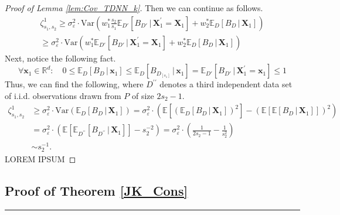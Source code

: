 \documentclass[letterpaper,10pt]{article}
\numberwithin{equation}{section}
\numberwithin{thm}{section}
\numberwithin{lem}{section}
\numberwithin{cor}{section}
\newcommand{\E}{\mathbb{E}}
\newcommand{\1}{\mathbbm{1}}
\newcommand{\Var}{\text{Var}}
\begin{document}
\begin{proof}[Proof of Lemma \ref{lem:Cov_TDNN_k}]
	Then we can continue as follows.
	\begin{equation}
		\begin{aligned}
			\zeta_{s_1, s_2}^{1}
			\geq \sigma_{\varepsilon}^{2}\cdot \Var\left(w_{1}^{*}\frac{s_2}{s_1}\E_{D'}\left[B_{D'}\, \Big| \, \mathbf{X}_1^{\prime} = \mathbf{X}_1 \right]
			+ w_{2}^{*}\E_D\left[B_D\, \Big| \, \mathbf{X}_1\right]\right)\\
			\geq \sigma_{\varepsilon}^{2}\cdot \Var\left(w_{1}^{*}\E_{D'}\left[B_{D'}\, \Big| \, \mathbf{X}_1^{\prime} = \mathbf{X}_1 \right]
			+ w_{2}^{*}\E_D\left[B_D\, \Big| \, \mathbf{X}_1\right]\right)
		\end{aligned}
	\end{equation}
	Next, notice the following fact.
	\begin{equation}
		\forall \mathbf{x}_1 \in \mathbb{R}^d: \quad 
		0
		\leq \E_D\left[B_D\, \Big| \, \mathbf{x}_1\right] 
		\leq \E_D\left[B_{D_{[s_1]}}\, \Big| \, \mathbf{x}_1\right] 
		= \E_{D'}\left[B_{D'}\, \Big| \, \mathbf{X}_1^{\prime} = \mathbf{x}_1\right] 
		\leq 1
	\end{equation}
	Thus, we can find the following, where $D^{\prime \prime}$ denotes a third independent data set of i.i.d. observations drawn from $P$ of size $2s_2 - 1$.
	\begin{equation}
		\begin{aligned}
			\zeta_{s_1, s_2}^{1}
			& \geq \sigma_{\varepsilon}^{2}\cdot \Var\left(\E_D\left[B_D\, \Big| \, \mathbf{X}_1\right]\right)
			= \sigma_{\varepsilon}^{2}\cdot \left(
				\E\left[\left(\E_D\left[B_D\, \Big| \, \mathbf{X}_1\right]\right)^2\right]
				- \left(\E\left[\E\left[B_D\, \Big| \, \mathbf{X}_1\right]\right]\right)^2
			\right)\\
			& = \sigma_{\varepsilon}^{2}\cdot \left(
				\E\left[\E_{D^{\prime \prime}}\left[B_{D^{\prime \prime}}\, \Big| \, \mathbf{X}_1\right]\right]
				- s_{2}^{-2}
			\right)
			= \sigma_{\varepsilon}^{2}\cdot \left(\frac{1}{2s_2 - 1} - \frac{1}{s_2^2}\right) \\
			& \sim s_2^{-1}.
		\end{aligned}
	\end{equation}
	{\color{red} LOREM IPSUM}
\end{proof}

\newpage
\subsection{Proof of Theorem \ref{JK_Cons}}
\hrule
\end{document}

